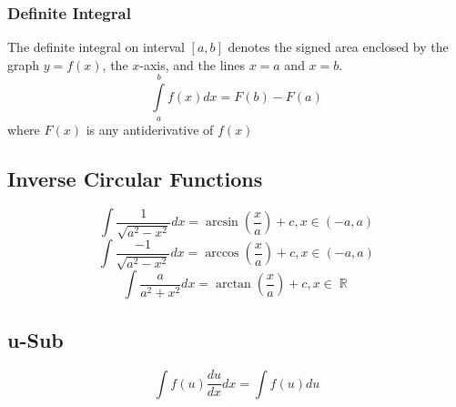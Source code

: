 \documentclass[a4paper,twoside,10pt]{article}
\DeclareMathOperator\R{\mathbb{R}}
\begin{document}
			\subsubsection{Definite Integral}
				The definite integral on interval $[a,b]$ denotes the signed area enclosed by the graph $y=f(x)$, the $x$-axis, and the lines $x=a$ and $x=b$.
				\[
					\int\limits_{a}^{b}f(x)dx=F(b)-F(a)
				\]
				where $F(x)$ is any antiderivative of $f(x)$
		\subsection{Inverse Circular Functions}
			\[
				\int\frac{1}{\sqrt{a^2-x^2}}dx=\arcsin\left(\frac{x}{a}\right)+c,x\in(-a,a)
			\]
			\[
				\int\frac{-1}{\sqrt{a^2-x^2}}dx=\arccos\left(\frac{x}{a}\right)+c,x\in(-a,a)
			\]
			\[
				\int\frac{a}{a^2+x^2}dx=\arctan\left(\frac{x}{a}\right)+c,x\in\R
			\]
		\subsection{u-Sub}
			\[
				\int f(u)\frac{du}{dx}dx=\int f(u)du
			\]
\end{document}
